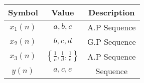 \begin{tabular}{|c|c|c|}
    \hline
     \textbf{Symbol} & \textbf{Value} &
     \textbf{Description} \\
    \hline
     $x_1(n)$ & ${a,b,c}$ & A.P Sequence\\[6pt]
    \hline
     $x_2(n)$ & ${b,c,d}$ & G.P Sequence\\[6pt]
    \hline
     $x_3(n)$ & $\left\{\frac{1}{c}, \frac{1}{d}, \frac{1}{e}\right\}$
 &  A.P Sequence\\[6pt]
    \hline
     $y(n)$   & ${a,c,e}$  & Sequence\\[6pt]
    \hline
\end{tabular}

